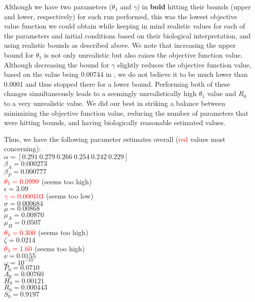 \documentclass[12pt]{article}
\begin{document}
Although we have two parameters ($\theta_1$ and $\gamma$) in \textbf{bold} hitting their bounds (upper and lower, respectively) for each run performed, this was the lowest objective value function we could obtain while keeping in mind realistic values for each of the parameters and initial conditions based on their biological interpretation, and using realistic bounds as described above. We note that increasing the upper bound for $\theta_1$ is not only unrealistic but also raises the objective function value. Although decreasing the bound for $\gamma$ slightly reduces the objective function value, based on the value being 0.00744 in \cite{Battista}, we do not believe it to be much lower than 0.0001 and thus stopped there for a lower bound. Performing both of these changes simultaneously leads to a seemingly unrealistically high $\theta_1$ value and $R_0$ to a very unrealistic value. We did our best in striking a balance between minimizing the objective function value, reducing the number of parameters that were hitting bounds, and having biologically reasonable estimated values. 

Thus, we have the following parameter estimates overall (\textcolor{red}{red} values most concerning): \\
$\alpha=[0.291  \   0.279  \   0.266    \   0.254 \    0.242    \     0.229   ]$ \\
$\beta_A=0.000273$ \\
$\beta_P=0.000777$ \\
$\textcolor{red}{\theta_1=0.0999}$ (seems too high)\\
$\epsilon=3.09$ \\
$\textcolor{red}{\gamma=0.000103}$ (seems too low) \\
$\sigma=0.000684$ \\
$\mu=0.00868$ \\
$\mu_{A}=0.00870$ \\
$\mu_{H}=0.0507$ \\
$\textcolor{red}{\theta_2=0.300}$ (seems too high) \\
$\zeta=0.0214$ \\
$\textcolor{red}{\theta_3=1.60}$ (seems too high) \\
$\nu=0.0155$ \\ 
$\omega=10^{-10}$ \\ 
$P_0=0.0710$ \\
$A_0=0.00760$ \\
$H_0=0.00121$ \\
$R_0=0.000443$ \\
$S_0=0.9197$ \\
\end{document}
